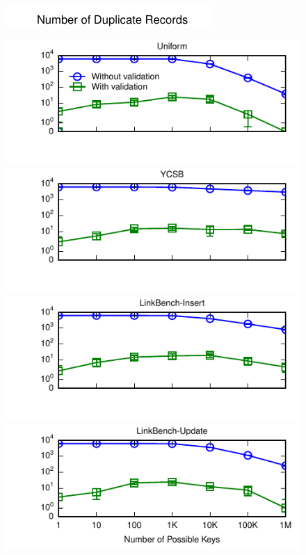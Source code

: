 \begin{figure}

\begin{minipage}[l]{0cm}
\includegraphics[angle=90, width=.185in]{figs/pk-workload-ylabel.pdf}
\end{minipage}
\begin{minipage}{\columnwidth}
\includegraphics[width=1\columnwidth]{figs/pk-workload-uniform-violations.pdf}\vspace{-2.5em}
\includegraphics[width=1\columnwidth]{figs/pk-workload-ycsb-violations.pdf}\vspace{-2.5em}
\includegraphics[width=1\columnwidth]{figs/pk-workload-linkbench-ins-violations.pdf}\vspace{-2.5em}
\includegraphics[width=1\columnwidth]{figs/pk-workload-linkbench-upd-violations.pdf}\vspace{-1em}

\end{minipage}
\end{figure}
